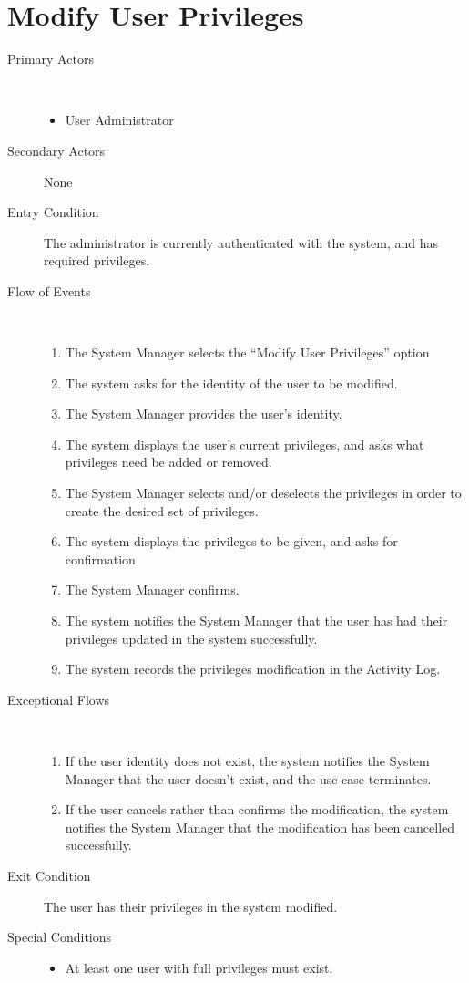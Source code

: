 \documentclass[a4paper,10pt]{report}
\begin{document}
\section{Modify User Privileges}
\begin{description}
\item[Primary Actors] \
  \begin{itemize}
  \item User Administrator
  \end{itemize}
\item[Secondary Actors] None
\item[Entry Condition]
  The administrator is currently authenticated with the system, and has required privileges.
\item[Flow of Events] \
  \begin{enumerate}
  \item The System Manager selects the ``Modify User Privileges'' option
  \item The system asks for the identity of the user to be modified.
  \item The System Manager provides the user's identity.
  \item The system displays the user's current privileges, and asks what privileges need be added or removed.
  \item The System Manager selects and/or deselects the privileges in order to create the desired set of privileges.
  \item The system displays the privileges to be given, and asks for confirmation
  \item The System Manager confirms.
  \item The system notifies the System Manager that the user has had their privileges updated in the system successfully.
    \item The system records the privileges modification in the Activity Log.
  \end{enumerate}
\item[Exceptional Flows] \
  \begin{enumerate}
  \item If the user identity does not exist, the system notifies the System Manager that the user doesn't exist, and the use case terminates.
  \item If the user cancels rather than confirms the modification, the system notifies the System Manager that the modification has been cancelled successfully.
  \end{enumerate}
\item[Exit Condition]
  The user has their privileges in the system modified.
\item[Special Conditions] 
\begin{itemize}
\item At least one user with full privileges must exist.
\end{itemize}
\end{description}
\end{document}
